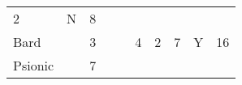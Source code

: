 \documentclass[12pt]{article}
\begin{document}
\begin{longtable}[]{@{}llllllllll@{}}
\begin{minipage}[t]{0.06\columnwidth}
2
\strut\end{minipage} &
\begin{minipage}[t]{0.07\columnwidth}\raggedright\strut
N
\strut\end{minipage} &
\begin{minipage}[t]{0.08\columnwidth}\raggedright\strut
8
\strut\end{minipage}\tabularnewline
\begin{minipage}[t]{0.13\columnwidth}\raggedright\strut
Bard
\strut\end{minipage} &
\begin{minipage}[t]{0.06\columnwidth}\raggedright\strut
\strut\end{minipage} &
\begin{minipage}[t]{0.06\columnwidth}\raggedright\strut
3
\strut\end{minipage} &
\begin{minipage}[t]{0.06\columnwidth}\raggedright\strut
\strut\end{minipage} &
\begin{minipage}[t]{0.06\columnwidth}\raggedright\strut
\strut\end{minipage} &
\begin{minipage}[t]{0.06\columnwidth}\raggedright\strut
4
\strut\end{minipage} &
\begin{minipage}[t]{0.06\columnwidth}\raggedright\strut
2
\strut\end{minipage} &
\begin{minipage}[t]{0.06\columnwidth}\raggedright\strut
7
\strut\end{minipage} &
\begin{minipage}[t]{0.07\columnwidth}\raggedright\strut
Y
\strut\end{minipage} &
\begin{minipage}[t]{0.08\columnwidth}\raggedright\strut
16
\strut\end{minipage}\tabularnewline
\begin{minipage}[t]{0.13\columnwidth}\raggedright\strut
Psionic
\strut\end{minipage} &
\begin{minipage}[t]{0.06\columnwidth}\raggedright\strut
\strut\end{minipage} &
\begin{minipage}[t]{0.06\columnwidth}\raggedright\strut
7
\strut\end{minipage} &
\begin{minipage}[t]{0.06\columnwidth}\raggedright\strut

\end{minipage}
\end{longtable}
\end{document}
